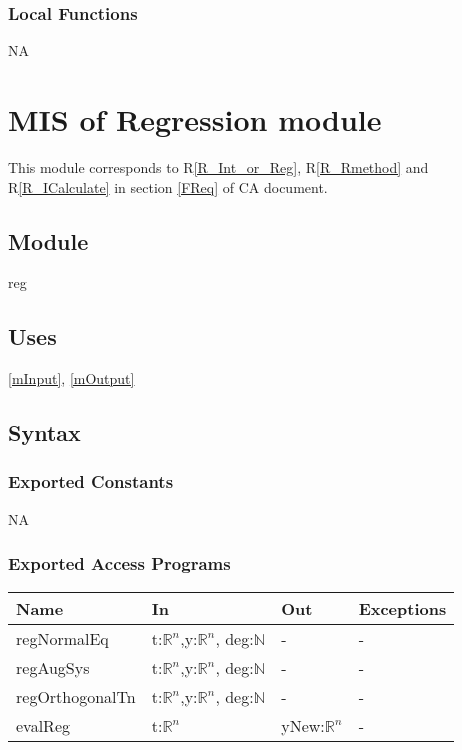 \documentclass[12pt, titlepage]{article}
\begin{document}
\subsubsection{Local Functions}

NA





\section{MIS of Regression module} \label{mReg}

This module corresponds to R\ref{R_Int_or_Reg}, R\ref{R_Rmethod} and 
R\ref{R_ICalculate} in section \ref{FReq} of CA document.


\subsection{Module}

reg

\subsection{Uses}

\ref{mInput}, \ref{mOutput} 


\subsection{Syntax}

\subsubsection{Exported Constants}


NA

\subsubsection{Exported Access Programs}

\begin{center}
	\begin{tabular}{p{4cm} p{4cm} p{4cm} p{1cm}}
		\hline
		\textbf{Name} & \textbf{In} & \textbf{Out} & \textbf{Exceptions} \\
		\hline
		regNormalEq & t:$\mathbb{R}^n$,y:$\mathbb{R}^n$, deg:$\mathbb{N}$  & 
		- & - \\
		regAugSys & t:$\mathbb{R}^n$,y:$\mathbb{R}^n$, deg:$\mathbb{N}$ & -
		& - \\
		regOrthogonalTn & t:$\mathbb{R}^n$,y:$\mathbb{R}^n$,  
		deg:$\mathbb{N}$ & -
		& - \\
		evalReg & t:$\mathbb{R}^n$ & yNew:$\mathbb{R}^n$ & - \\
		
		\hline
	\end{tabular}
\end{center}
\end{document}
